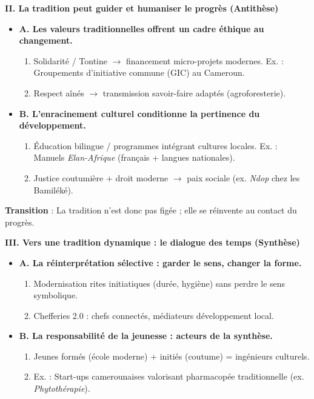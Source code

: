 \documentclass[11pt]{article}
\begin{document}
\begin{exoresolu}
\textbf{II. La tradition peut guider et humaniser le progrès (Antithèse)}
\begin{itemize}
\item \textbf{A. Les valeurs traditionnelles offrent un cadre éthique au changement.}
  \begin{enumerate}
  \item Solidarité / Tontine $\rightarrow$ financement micro-projets modernes. Ex. : Groupements d'initiative commune (GIC) au Cameroun.
  \item Respect aînés $\rightarrow$ transmission savoir-faire adaptés (agroforesterie).
  \end{enumerate}
\item \textbf{B. L'enracinement culturel conditionne la pertinence du développement.}
  \begin{enumerate}
  \item Éducation bilingue / programmes intégrant cultures locales. Ex. : Manuels \emph{Elan-Afrique} (français + langues nationales).
  \item Justice coutumière + droit moderne $\rightarrow$ paix sociale (ex. \emph{Ndop} chez les Bamiléké).
  \end{enumerate}
\end{itemize}
\textbf{Transition} : \og La tradition n'est donc pas figée ; elle se réinvente au contact du progrès. \fg

\textbf{III. Vers une tradition dynamique : le dialogue des temps (Synthèse)}
\begin{itemize}
\item \textbf{A. La réinterprétation sélective : garder le sens, changer la forme.}
  \begin{enumerate}
  \item Modernisation rites initiatiques (durée, hygiène) sans perdre le sens symbolique.
  \item Chefferies 2.0 : chefs connectés, médiateurs développement local.
  \end{enumerate}
\item \textbf{B. La responsabilité de la jeunesse : acteurs de la synthèse.}
  \begin{enumerate}
  \item Jeunes formés (école moderne) + initiés (coutume) = ingénieurs culturels.
  \item Ex. : Start-ups camerounaises valorisant pharmacopée traditionnelle (ex. \emph{Phytothérapie}).
  \end{enumerate}
\end{itemize}


\end{exoresolu}
\end{document}
